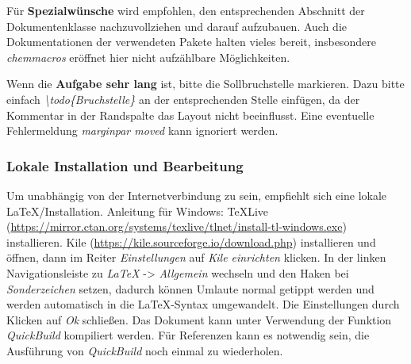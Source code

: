\documentclass[./main.tex]{subfiles}
\begin{document}
F\"ur \textbf{Spezialw\"unsche} wird empfohlen, den entsprechenden Abschnitt der Dokumentenklasse nachzuvollziehen und darauf aufzubauen. Auch die Dokumentationen der verwendeten Pakete halten vieles bereit, insbesondere \textit{chemmacros} er\"offnet hier nicht aufz\"ahlbare M\"oglichkeiten. \par 
Wenn die \textbf{Aufgabe sehr lang} ist, bitte die Sollbruchstelle markieren. Dazu bitte einfach \textit{\textbackslash{}todo\{Bruchstelle\}} an der entsprechenden Stelle einf\"ugen, da der Kommentar in der Randspalte das Layout nicht beeinflusst. Eine eventuelle Fehlermeldung \textit{marginpar moved} kann ignoriert werden.

\subsubsection{Lokale Installation und Bearbeitung}
Um unabh\"angig von der Internetverbindung zu sein, empfiehlt sich eine lokale \LaTeX\-/Installation. Anleitung f\"ur Windows: TeXLive (\url{https://mirror.ctan.org/systems/texlive/tlnet/install-tl-windows.exe}) installieren. Kile (\url{https://kile.sourceforge.io/download.php}) installieren und \"offnen, dann im Reiter \textit{Einstellungen} auf \textit{Kile einrichten} klicken. In der linken Navigationsleiste zu \textit{LaTeX} -> \textit{Allgemein} wechseln und den Haken bei \textit{Sonderzeichen} setzen, dadurch k\"onnen Umlaute normal getippt werden und werden automatisch in die \LaTeX-Syntax umgewandelt. Die Einstellungen durch Klicken auf \textit{Ok} schlie\ss{}en. Das Dokument kann unter Verwendung der Funktion \textit{QuickBuild} kompiliert werden. F\"ur Referenzen kann es notwendig sein, die Ausf\"uhrung von \textit{QuickBuild} noch einmal zu wiederholen.
\end{document}
